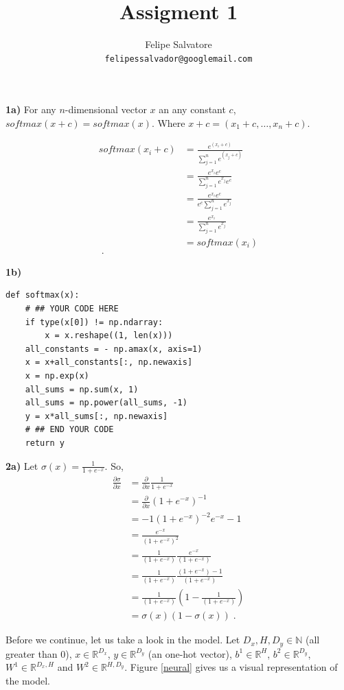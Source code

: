 \documentclass{article}
\title{Assigment 1}
\author{Felipe Salvatore\\
\texttt{felipessalvador@googlemail.com}}
\begin{document}
\maketitle
\textbf{1a)} For any $n$-dimensional vector $x$ an any constant $c$, $softmax(x +c) = softmax(x)$. Where $x+c = (x_1 +c,\dots,x_n +c)$.

\begin{align*}
softmax(x_i +c) & = \frac{e^{(x_{i}+c)}}{\sum_{j=1}^{n} e^{(x_j + c)}} \\
& = \frac{e^{x_{i}}e^{c}}{\sum_{j=1}^{n} e^{x_j}e^{c}}\\
& = \frac{e^{x_{i}}e^{c}}{e^{c}\sum_{j=1}^{n} e^{x_j}}\\
& = \frac{e^{x_{i}}}{\sum_{j=1}^{n} e^{x_j}}\\
& = softmax(x_i)\\ \; .
\end{align*}


\textbf{1b)}

\begin{verbatim}
def softmax(x):
    # ## YOUR CODE HERE
    if type(x[0]) != np.ndarray:
        x = x.reshape((1, len(x)))
    all_constants = - np.amax(x, axis=1)
    x = x+all_constants[:, np.newaxis]
    x = np.exp(x)
    all_sums = np.sum(x, 1)
    all_sums = np.power(all_sums, -1)
    y = x*all_sums[:, np.newaxis]
    # ## END YOUR CODE
    return y
\end{verbatim}

\textbf{2a)} Let $\sigma(x) = \frac{1}{1+e^{-x}}$. So, 
\begin{align*}
\frac{\partial \sigma}{\partial x} & = \frac{\partial}{\partial x}\frac{1}{1+e^{-x}} \\
& =\frac{\partial }{\partial x}(1+e^{-x})^{-1} \\
& = -1 (1+e^{-x})^{-2}e^{-x} -1\\
& = \frac{e^{-x}}{(1+e^{-x})^{2}}\\
& = \frac{1}{(1+e^{-x})}\frac{e^{-x}}{(1+e^{-x})}\\
& = \frac{1}{(1+e^{-x})}\frac{(1+e^{-x}) -1}{(1+e^{-x})}\\
& = \frac{1}{(1+e^{-x})}(1 - \frac{1}{(1+e^{-x})})\\
& = \sigma(x)(1 - \sigma(x)) \; .
\end{align*}

\vspace{0.5cm}

Before we continue, let us take a look in the model. Let $D_x,H,D_y \in  \mathbb{N}$ (all greater than $0$), $x \in \mathbb{R}^{D_x}$, $y \in \mathbb{R}^{D_y}$ (an one-hot vector), $b^{1} \in \mathbb{R}^{H}$, $b^{2} \in \mathbb{R}^{D_{y}}$, $W^{1} \in \mathbb{R}^{D_x,H}$ and $W^{2} \in \mathbb{R}^{H,D_y}$. Figure \ref{neural} gives us a visual representation of the model. 
\end{document}
